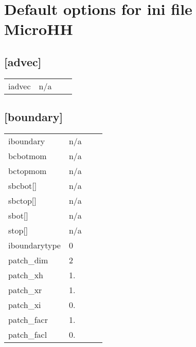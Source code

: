 \documentclass[a4paper,10pt]{extarticle}
\begin{document}
\section{Default options for ini file MicroHH}
\subsection{[advec]}
\tablelasttail{\hline}
\begin{supertabular}{llll}
iadvec        & n/a   & \\
\end{supertabular}
\subsection{[boundary]}
\tablelasttail{\hline}
\begin{supertabular}{llll}
iboundary     & n/a   & \\
bcbotmom      & n/a   & \\
bctopmom      & n/a   & \\
sbcbot[]      & n/a   & \\
sbctop[]      & n/a   & \\
sbot[]        & n/a   & \\
stop[]        & n/a   & \\
iboundarytype & 0     & \\
patch\_dim    & 2     & \\
patch\_xh     & 1.    & \\
patch\_xr     & 1.    & \\
patch\_xi     & 0.    & \\
patch\_facr   & 1.    & \\
patch\_facl   & 0.    & \\
\end{supertabular}
\end{document}
